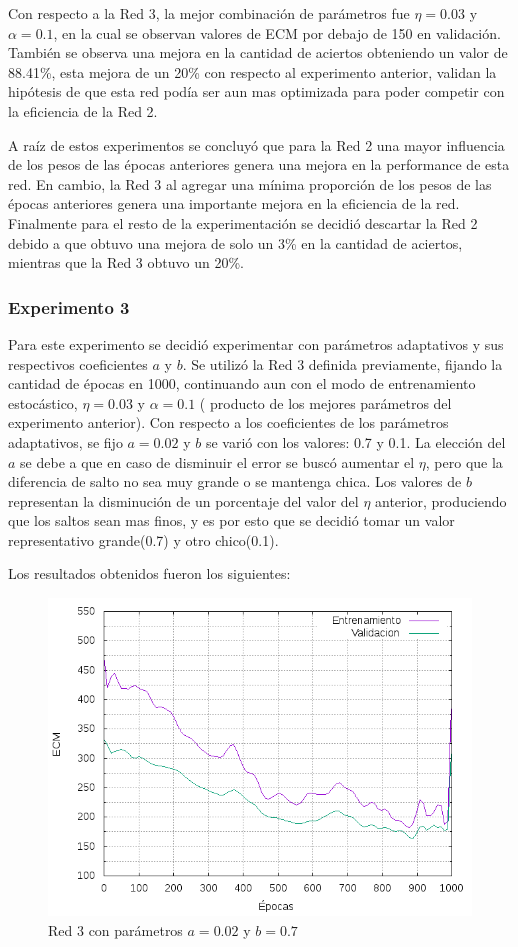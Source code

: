 Con respecto a la Red 3, la mejor combinación de parámetros fue $\eta = 0.03$ y $\alpha = 0.1$, en la cual se observan valores de ECM por debajo de 150
en validación. También se observa una mejora en la cantidad de aciertos obteniendo un valor de 88.41\%, esta mejora de un 20\% con respecto al experimento
anterior, validan la hipótesis de que esta red podía ser aun mas optimizada para poder competir con la eficiencia de la Red 2.


A raíz de estos experimentos se concluyó que para la Red 2 una mayor influencia de los pesos de las épocas anteriores genera una mejora en la performance
de esta red. En cambio, la Red 3 al agregar una mínima proporción de los pesos de las épocas anteriores genera una importante mejora en la eficiencia
de la red.
Finalmente para el resto de la experimentación se decidió descartar la Red 2 debido a que obtuvo una mejora de solo un 3\% en la cantidad de aciertos,
mientras que la Red 3 obtuvo un 20\%.

\subsubsection{Experimento 3}
Para este experimento se decidió experimentar con parámetros adaptativos y sus respectivos coeficientes $a$ y $b$. Se utilizó la Red 3 definida
previamente, fijando la cantidad de épocas en 1000, continuando aun con el modo de entrenamiento estocástico, $\eta = 0.03$ y $\alpha = 0.1$ ( producto
de los mejores parámetros del experimento anterior).
Con respecto a los coeficientes de los parámetros adaptativos, se fijo $a = 0.02$ y $b$ se varió con los valores: 0.7 y 0.1. La elección del $a$ se debe
a que en caso de disminuir el error se buscó aumentar el $\eta$, pero que la diferencia de salto no sea muy grande o se mantenga chica. Los valores de
 $b$ representan la disminución de un porcentaje del valor del $\eta$ anterior, produciendo que los saltos sean mas finos, y es por esto que se decidió
 tomar un valor representativo grande(0.7) y otro chico(0.1).

Los resultados obtenidos fueron los siguientes:
\begin{figure}[H]
  \includegraphics[width=125mm]{imagenes/ej1/ex_3-1_red_11-6-6-9-1_errors.png}
  \caption{Red 3 con parámetros $a = 0.02 $ y $b= 0.7$}
\end{figure}

